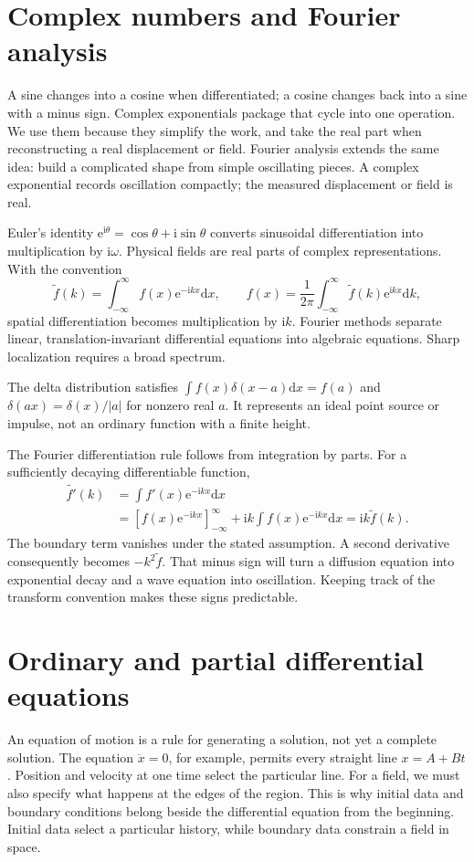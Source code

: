 \documentclass[11pt,oneside]{book}
\newcommand{\dd}{\mathrm{d}}
\newcommand{\ii}{\mathrm{i}}
\newcommand{\ee}{\mathrm{e}}
\theoremstyle{reviewstyle}
\begin{document}
\section{Complex numbers and Fourier analysis}
A sine changes into a cosine when differentiated; a cosine changes back into a sine with a minus sign. Complex exponentials package that cycle into one operation. We use them because they simplify the work, and take the real part when reconstructing a real displacement or field. Fourier analysis extends the same idea: build a complicated shape from simple oscillating pieces. A complex exponential records oscillation compactly; the measured displacement or field is real.

Euler's identity $\ee^{\ii\theta}=\cos\theta+\ii\sin\theta$ converts sinusoidal differentiation into multiplication by $\ii\omega$. Physical fields are real parts of complex representations. With the convention
\begin{equation}
\widetilde f(k)=\int_{-\infty}^{\infty}f(x)\ee^{-\ii kx}\dd x,
\qquad
f(x)=\frac{1}{2\pi}\int_{-\infty}^{\infty}\widetilde f(k)\ee^{\ii kx}\dd k,
\end{equation}
spatial differentiation becomes multiplication by $\ii k$. Fourier methods separate linear, translation-invariant differential equations into algebraic equations. Sharp localization requires a broad spectrum.

The delta distribution satisfies $\int f(x)\delta(x-a)\dd x=f(a)$ and $\delta(ax)=\delta(x)/|a|$ for nonzero real $a$. It represents an ideal point source or impulse, not an ordinary function with a finite height.

The Fourier differentiation rule follows from integration by parts. For a sufficiently decaying differentiable function,
\begin{align}
\widetilde{f'}(k)
&=\int f'(x)\ee^{-\ii kx}\dd x\\
&=\left[f(x)\ee^{-\ii kx}\right]_{-\infty}^{\infty}
+\ii k\int f(x)\ee^{-\ii kx}\dd x
=\ii k\widetilde f(k).
\end{align}
The boundary term vanishes under the stated assumption. A second derivative consequently becomes $-k^2\widetilde f$. That minus sign will turn a diffusion equation into exponential decay and a wave equation into oscillation. Keeping track of the transform convention makes these signs predictable.

\section{Ordinary and partial differential equations}
An equation of motion is a rule for generating a solution, not yet a complete solution. The equation $\ddot x=0$, for example, permits every straight line $x=A+Bt$. Position and velocity at one time select the particular line. For a field, we must also specify what happens at the edges of the region. This is why initial data and boundary conditions belong beside the differential equation from the beginning. Initial data select a particular history, while boundary data constrain a field in space.
\end{document}
